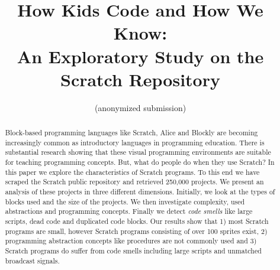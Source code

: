 \documentclass{sig-alternate}
\begin{document}
%

\title{How Kids Code and How We Know:\\An Exploratory Study on the Scratch Repository }

\author{
\alignauthor
(anonymized submission)
}


\maketitle
\begin{abstract}
Block-based programming languages like Scratch, Alice and Blockly are becoming increasingly common as introductory languages in programming education. There is substantial research showing that these visual programming environments are suitable for teaching programming concepts. But, what do people do when they use Scratch? In this paper we explore the characteristics of Scratch programs. To this end we have scraped the Scratch public repository and retrieved 250,000 projects. We present an analysis of these projects in three different dimensions. Initially, we look at the types of blocks used and the size of the projects. We then investigate complexity, used abstractions and programming concepts. Finally we detect \emph{code smells} like large scripts, dead code and duplicated code blocks. Our results show that 1) most Scratch programs are small, however Scratch programs consisting of over 100 sprites exist, 2) programming abstraction concepts like procedures are not commonly used and 3) Scratch programs do suffer from code smells including large scripts and unmatched broadcast signals.
\end{abstract}
\end{document}
